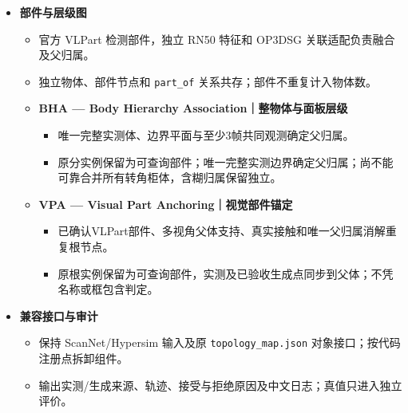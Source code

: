 \documentclass[UTF8,fontset=fandol]{ctexart}
\begin{document}
\begin{itemize}
\begin{itemize}
\begin{itemize}
\item \textbf{PCB — Physical Cue Boxes｜物理表面定向框}：优先两个广阔正交实测面；末段可用可靠竖直单面提供方向，原点极值提供尺寸，证据不足回退原求解器。

\end{itemize}

\item \textbf{部件与层级图}


\begin{itemize}
\item 官方 VLPart 检测部件，独立 RN50 特征和 OP3DSG 关联适配负责融合及父归属。


\item 独立物体、部件节点和 \texttt{part\_\allowbreak{}of} 关系共存；部件不重复计入物体数。


\item \textbf{BHA — Body Hierarchy Association｜整物体与面板层级}


\begin{itemize}
\item 唯一完整实测体、边界平面与至少3帧共同观测确定父归属。


\item 原分实例保留为可查询部件；唯一完整实测边界确定父归属；尚不能可靠合并所有转角柜体，含糊归属保留独立。

\end{itemize}

\item \textbf{VPA — Visual Part Anchoring｜视觉部件锚定}


\begin{itemize}
\item 已确认VLPart部件、多视角父体支持、真实接触和唯一父归属消解重复根节点。


\item 原根实例保留为可查询部件，实测及已验收生成点同步到父体；不凭名称或框包含判定。

\end{itemize}
\end{itemize}

\item \textbf{兼容接口与审计}


\begin{itemize}
\item 保持 ScanNet/Hypersim 输入及原 \texttt{topology\_\allowbreak{}map.\allowbreak{}json} 对象接口；按代码注册点拆卸组件。


\item 输出实测/生成来源、轨迹、接受与拒绝原因及中文日志；真值只进入独立评价。



\end{itemize}
\end{itemize}
\end{itemize}
\end{document}
